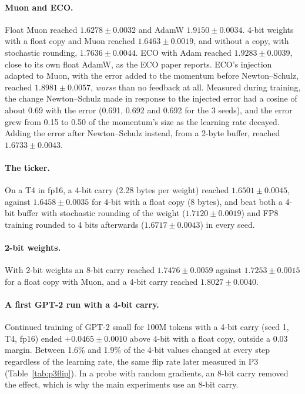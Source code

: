 \documentclass[11pt]{article}
\begin{document}
\paragraph{Muon and ECO.} Float Muon reached $1.6278 \pm 0.0032$ and AdamW $1.9150 \pm 0.0034$. 4-bit weights with a
float copy and Muon reached $1.6463 \pm 0.0019$, and without a copy, with stochastic rounding, $1.7636 \pm 0.0044$. ECO
with Adam reached $1.9283 \pm 0.0039$, close to its own float AdamW, as the ECO paper reports. ECO's injection adapted
to Muon, with the error added to the momentum before Newton--Schulz, reached $1.8981 \pm 0.0057$, \emph{worse} than no
feedback at all. Measured during training, the change Newton--Schulz made in response to the injected error had a
cosine of about 0.69 with the error (0.691, 0.692 and 0.692 for the 3 seeds), and the error grew from 0.15 to 0.50 of
the momentum's size as the learning rate decayed. Adding the error after Newton--Schulz instead, from a 2-byte buffer,
reached $1.6733 \pm 0.0043$.

\paragraph{The ticker.} On a T4 in fp16, a 4-bit carry (2.28 bytes per weight) reached $1.6501 \pm 0.0045$, against
$1.6458 \pm 0.0035$ for 4-bit with a float copy (8 bytes), and beat both a 4-bit buffer with stochastic rounding of the
weight ($1.7120 \pm 0.0019$) and FP8 training rounded to 4 bits afterwards ($1.6717 \pm 0.0043$) in every seed.

\paragraph{2-bit weights.} With 2-bit weights an 8-bit carry reached $1.7476 \pm 0.0059$ against $1.7253 \pm 0.0015$
for a float copy with Muon, and a 4-bit carry reached $1.8027 \pm 0.0040$.

\paragraph{A first GPT-2 run with a 4-bit carry.} Continued training of GPT-2 small for 100M tokens with a 4-bit carry
(seed 1, T4, fp16) ended $+0.0465 \pm 0.0010$ above 4-bit with a float copy, outside a 0.03 margin. Between 1.6\% and
1.9\% of the 4-bit values changed at every step regardless of the learning rate, the same flip rate later measured in
P3 (Table~\ref{tab:p3flip}). In a probe with random gradients, an 8-bit carry removed the effect, which is why the main
experiments use an 8-bit carry.
\end{document}
